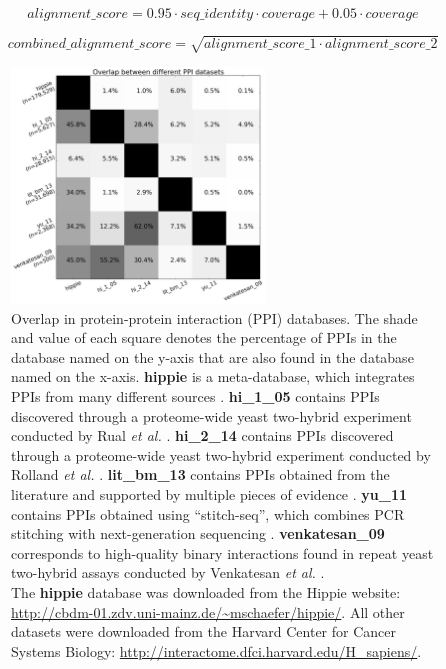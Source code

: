 \begin{equation} \label{eq:core_alignment_score}
	alignment\_score = 0.95 \cdot seq\_identity \cdot coverage + 0.05 \cdot coverage
\end{equation}

\begin{equation} \label{eq:interface_alignment_score}
	combined\_alignment\_score = \sqrt{alignment\_score\_1 \cdot alignment\_score\_2}
\end{equation}


\begin{figure}[!tb]
	\centering
	\includegraphics[width=0.6\textwidth]{static/profs/ppi_database_overlap.png}
	\caption[Overlap in protein-protein interaction databases.]{Overlap in protein-protein interaction (PPI) databases. The shade and value of each square denotes the percentage of PPIs in the database named on the y-axis that are also found in the database named on the x-axis. \textbf{hippie} is a meta-database, which integrates PPIs from many different sources \cite{schaefer_hippie:_2012}. \textbf{hi\_1\_05} contains PPIs discovered through a proteome-wide yeast two-hybrid experiment conducted by Rual \textit{et al.} \cite{rual_towards_2005}. \textbf{hi\_2\_14} contains PPIs discovered through a proteome-wide yeast two-hybrid experiment conducted by Rolland \textit{et al.} \cite{rolland_proteome-scale_2014}. \textbf{lit\_bm\_13} contains PPIs obtained from the literature and supported by multiple pieces of evidence \cite{rolland_proteome-scale_2014}. \textbf{yu\_11} contains PPIs obtained using ``stitch-seq'', which combines PCR stitching with next-generation sequencing \cite{yu_next-generation_2011}. \textbf{venkatesan\_09} corresponds to high-quality binary interactions found in repeat yeast two-hybrid assays conducted by Venkatesan \textit{et al.} \cite{venkatesan_empirical_2009}. \\
	The \textbf{hippie} database was downloaded from the Hippie website: \url{http://cbdm-01.zdv.uni-mainz.de/~mschaefer/hippie/}. All other datasets were downloaded from the Harvard Center for Cancer Systems Biology: \url{http://interactome.dfci.harvard.edu/H_sapiens/}.}
	\label{fig:ppi_database_overlap}
\end{figure}



